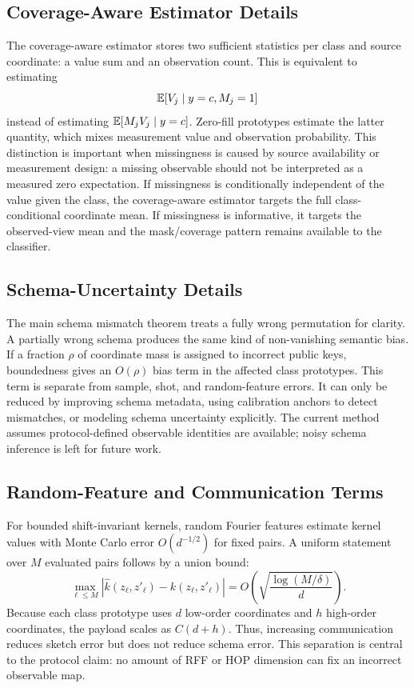 \subsection{Coverage-Aware Estimator Details}

The coverage-aware estimator stores two sufficient statistics per class and source coordinate: a value sum and an observation count. This is equivalent to estimating
\begin{equation}
    \mathbb{E}[V_j\mid y=c,M_j=1]
\end{equation}
instead of estimating \(\mathbb{E}[M_jV_j\mid y=c]\). Zero-fill prototypes estimate the latter quantity, which mixes measurement value and observation probability. This distinction is important when missingness is caused by source availability or measurement design: a missing observable should not be interpreted as a measured zero expectation. If missingness is conditionally independent of the value given the class, the coverage-aware estimator targets the full class-conditional coordinate mean. If missingness is informative, it targets the observed-view mean and the mask/coverage pattern remains available to the classifier.

\subsection{Schema-Uncertainty Details}

The main schema mismatch theorem treats a fully wrong permutation for clarity. A partially wrong schema produces the same kind of non-vanishing semantic bias. If a fraction \(\rho\) of coordinate mass is assigned to incorrect public keys, boundedness gives an \(O(\rho)\) bias term in the affected class prototypes. This term is separate from sample, shot, and random-feature errors. It can only be reduced by improving schema metadata, using calibration anchors to detect mismatches, or modeling schema uncertainty explicitly. The current method assumes protocol-defined observable identities are available; noisy schema inference is left for future work.

\subsection{Random-Feature and Communication Terms}

For bounded shift-invariant kernels, random Fourier features estimate kernel values with Monte Carlo error \(O(d^{-1/2})\) for fixed pairs. A uniform statement over \(M\) evaluated pairs follows by a union bound:
\begin{equation}
    \max_{\ell\le M}|\hat{k}(z_\ell,z'_\ell)-k(z_\ell,z'_\ell)|
    =
    O\!\left(\sqrt{\frac{\log(M/\delta)}{d}}\right).
\end{equation}
Because each class prototype uses \(d\) low-order coordinates and \(h\) high-order coordinates, the payload scales as \(C(d+h)\). Thus, increasing communication reduces sketch error but does not reduce schema error. This separation is central to the protocol claim: no amount of RFF or HOP dimension can fix an incorrect observable map.

